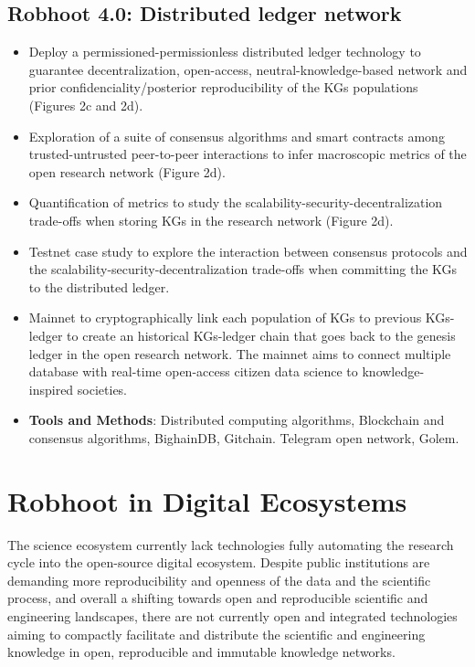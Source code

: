 \documentclass[10pt, a4paper, twocolumn]{article} %
\begin{document}
{  \subsection{Robhoot 4.0: Distributed ledger network}
  \begin{itemize}
  \item Deploy a permissioned-permissionless distributed ledger
    technology to guarantee decentralization, open-access,
    neutral-knowledge-based network and prior
    confidenciality/posterior reproducibility of the KGs populations
    (Figures 2c and 2d).
  \item Exploration of a suite of consensus algorithms and smart
    contracts among trusted-untrusted peer-to-peer interactions to
    infer macroscopic metrics of the open research network (Figure
    2d).
  \item Quantification of metrics to study the
    scalability-security-decentralization trade-offs when storing KGs
    in the research network (Figure 2d).
  \item Testnet case study to explore the interaction between
    consensus protocols and the scalability-security-decentralization
    trade-offs when committing the KGs to the distributed ledger.
  \item Mainnet to cryptographically link each population of KGs to
    previous KGs-ledger to create an historical KGs-ledger chain that
    goes back to the genesis ledger in the open research network. The
    mainnet aims to connect multiple database with real-time
    open-access citizen data science to knowledge-inspired societies.
  \end{itemize}

   \begin{itemize}
   \item {\bf Tools and Methods}: Distributed computing algorithms,
     Blockchain and consensus algorithms, BighainDB,
     Gitchain. Telegram open network, Golem.
 \end{itemize}
  
  \section{Robhoot in Digital Ecosystems}
  The science ecosystem currently lack technologies fully automating
  the research cycle into the open-source digital ecosystem. Despite
  public institutions are demanding more reproducibility and openness
  of the data and the scientific process, and overall a shifting
  towards open and reproducible scientific and engineering landscapes,
  there are not currently open and integrated technologies aiming to
  compactly facilitate and distribute the scientific and engineering
  knowledge in open, reproducible and immutable knowledge networks.
  
}
\end{document}

